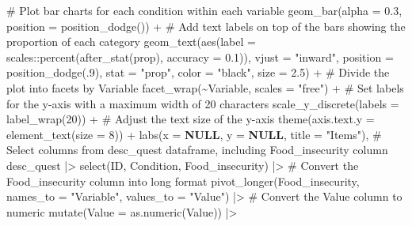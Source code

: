 \documentclass[
  bookmarksnumbered]{article}
\newenvironment{Shaded}{\begin{snugshade}}{\end{snugshade}}
\newcommand{\AttributeTok}[1]{\textcolor[rgb]{0.80,0.80,0.80}{#1}}
\newcommand{\CommentTok}[1]{\textcolor[rgb]{0.50,0.62,0.50}{#1}}
\newcommand{\ConstantTok}[1]{\textcolor[rgb]{0.86,0.64,0.64}{\textbf{#1}}}
\newcommand{\DecValTok}[1]{\textcolor[rgb]{0.86,0.86,0.80}{#1}}
\newcommand{\FloatTok}[1]{\textcolor[rgb]{0.75,0.75,0.82}{#1}}
\newcommand{\FunctionTok}[1]{\textcolor[rgb]{0.94,0.94,0.56}{#1}}
\newcommand{\NormalTok}[1]{\textcolor[rgb]{0.80,0.80,0.80}{#1}}
\newcommand{\SpecialCharTok}[1]{\textcolor[rgb]{0.86,0.64,0.64}{#1}}
\newcommand{\StringTok}[1]{\textcolor[rgb]{0.80,0.58,0.58}{#1}}
\begin{document}
\begin{Shaded}
\begin{Highlighting}[]
    \CommentTok{\# Plot bar charts for each condition within each variable}
    \FunctionTok{geom\_bar}\NormalTok{(}\AttributeTok{alpha =} \FloatTok{0.3}\NormalTok{, }\AttributeTok{position =} \FunctionTok{position\_dodge}\NormalTok{()) }\SpecialCharTok{+}
    \CommentTok{\# Add text labels on top of the bars showing the proportion of each category}
    \FunctionTok{geom\_text}\NormalTok{(}\FunctionTok{aes}\NormalTok{(}\AttributeTok{label =}\NormalTok{ scales}\SpecialCharTok{::}\FunctionTok{percent}\NormalTok{(}\FunctionTok{after\_stat}\NormalTok{(prop), }\AttributeTok{accuracy =} \FloatTok{0.1}\NormalTok{)),}
      \AttributeTok{vjust =} \StringTok{"inward"}\NormalTok{,}
      \AttributeTok{position =} \FunctionTok{position\_dodge}\NormalTok{(.}\DecValTok{9}\NormalTok{),}
      \AttributeTok{stat =} \StringTok{"prop"}\NormalTok{,}
      \AttributeTok{color =} \StringTok{"black"}\NormalTok{,}
      \AttributeTok{size =} \FloatTok{2.5}\NormalTok{) }\SpecialCharTok{+}
    \CommentTok{\# Divide the plot into facets by Variable}
    \FunctionTok{facet\_wrap}\NormalTok{(}\SpecialCharTok{\textasciitilde{}}\NormalTok{Variable, }\AttributeTok{scales =} \StringTok{"free"}\NormalTok{) }\SpecialCharTok{+}
    \CommentTok{\# Set labels for the y{-}axis with a maximum width of 20 characters}
    \FunctionTok{scale\_y\_discrete}\NormalTok{(}\AttributeTok{labels =} \FunctionTok{label\_wrap}\NormalTok{(}\DecValTok{20}\NormalTok{)) }\SpecialCharTok{+}
    \CommentTok{\# Adjust the text size of the y{-}axis}
    \FunctionTok{theme}\NormalTok{(}\AttributeTok{axis.text.y =} \FunctionTok{element\_text}\NormalTok{(}\AttributeTok{size =} \DecValTok{8}\NormalTok{)) }\SpecialCharTok{+}
    \FunctionTok{labs}\NormalTok{(}\AttributeTok{x =} \ConstantTok{NULL}\NormalTok{, }\AttributeTok{y =} \ConstantTok{NULL}\NormalTok{, }\AttributeTok{title =} \StringTok{"Items"}\NormalTok{),}
  \CommentTok{\# Select columns from desc\_quest dataframe, including Food\_insecurity column}
\NormalTok{  desc\_quest }\SpecialCharTok{|\textgreater{}}
    \FunctionTok{select}\NormalTok{(ID, Condition, Food\_insecurity) }\SpecialCharTok{|\textgreater{}}
    \CommentTok{\# Convert the Food\_insecurity column into long format}
    \FunctionTok{pivot\_longer}\NormalTok{(Food\_insecurity,}
      \AttributeTok{names\_to =} \StringTok{"Variable"}\NormalTok{,}
      \AttributeTok{values\_to =} \StringTok{"Value"}\NormalTok{) }\SpecialCharTok{|\textgreater{}}
    \CommentTok{\# Convert the Value column to numeric}
    \FunctionTok{mutate}\NormalTok{(}\AttributeTok{Value =} \FunctionTok{as.numeric}\NormalTok{(Value)) }\SpecialCharTok{|\textgreater{}}

\end{Highlighting}
\end{Shaded}
\end{document}
